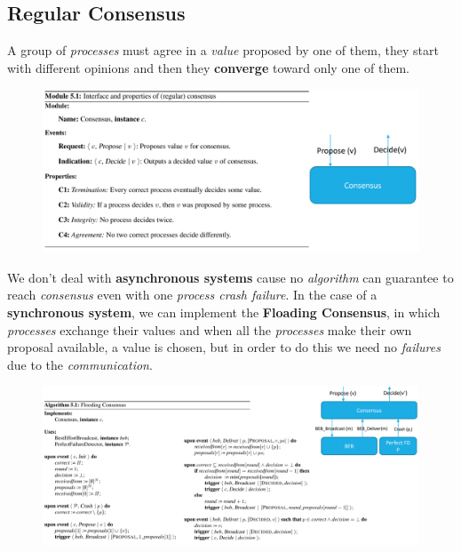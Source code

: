 \documentclass{article}
\begin{document}
\subsection{Regular Consensus}
A group of \emph{processes} must agree in a \emph{value} proposed by one of them, they start with different opinions and then they \textbf{converge} toward only one of them. 
\begin{figure}[H]
  \centering
  \includegraphics[scale=0.7,left]{cattura42.png}
\end{figure}
We don't deal with \textbf{asynchronous systems} cause no \emph{algorithm} can guarantee to reach \emph{consensus} even with one \emph{process crash failure}. In the case of a \textbf{synchronous system}, we can implement the \textbf{Floading Consensus}, in which \emph{processes} exchange their values and when all the \emph{processes} make their own proposal available, a value is chosen, but in order to do this we need no \emph{failures} due to the \emph{communication}. 
\begin{figure}[H]
  \centering
  \includegraphics[scale=0.7,left]{cattura43.png}
\end{figure}
\end{document}
